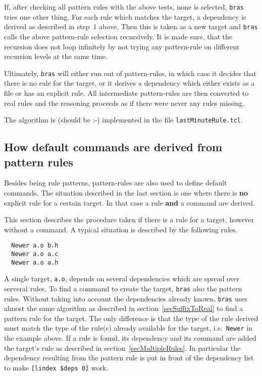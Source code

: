 \documentclass[12pt]{article}
\newcommand{\bras}{\texttt{bras}}
\begin{document}
If, after checking all pattern rules with the above tests, none is
selected, \bras{} tries one other thing. For each rule which matches
the target, a dependency is derived as described in step~1 above. Then
this is taken as a new target and \bras{} calls the above pattern-rule
selection recursively. It is made sure, that the recursion does not
loop infinitely by not trying any pattern-rule on different recursion
levels at the same time.

Ultimately, \bras{} will either run out of pattern-rules, in which
case it decides that there is no rule for the target, or it derives a
dependency which either exists as a file or has an explicit rule. All
intermediate pattern-rules are then converted to real rules and the
reasoning proceeds as if there were never any rules missing.

The algorithm is (should be :-) implemented in the file
\texttt{lastMinuteRule.tcl}.

\subsection{How default commands are derived from pattern rules}
\label{secSuffixAsDefCmd}
Besides being rule patterns, pattern-rules are also used to define
default commands. The situation described in the last section is one
where there is \textbf{no} explicit rule for a certain target. In that
case a rule \textbf{and} a command are derived. 

This section describes the procedure taken if there is a rule for a
target, however without a command. A typical situation is described by
the following rules.

\begin{verbatim}
  Newer a.o b.h
  Newer a.o a.c
  Newer a.o a.h
\end{verbatim}

A single target, \texttt{a.o}, depends on several dependencies which
are spread over serveral rules. To find a command to create the
target, \bras{} also the pattern rules. Without taking into
account the dependencies already known, \bras{} uses almost the same
algorithm as described in section~\ref{secSuffixToReal} to find a
pattern rule for the target. The only difference is that the type of
the rule derived must match the type of the rule(s) already available
for the target, i.e.\ \texttt{Newer} in the example above. If a rule
is found, its dependency and its command are added the target's rule
as described in section~\ref{secMultipleRules}. In particular the
dependency resulting from the pattern rule is put in front of the
dependency list to make \texttt{[lindex \$deps 0]} work.
\end{document}
